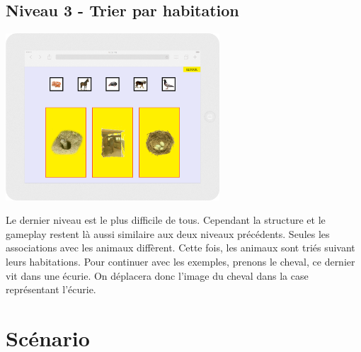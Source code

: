 \documentclass{article}
\begin{document}
\subsection{Niveau 3 - Trier par habitation}
\vspace{0.5cm}
\begin{center}
\includegraphics[width=0.6\textwidth]{page4}
\end{center}
\vspace{0.5cm}
\hspace*{0.6cm}Le dernier niveau est le plus difficile de tous. Cependant la structure et le gameplay restent l\`a aussi similaire aux deux niveaux pr\'ec\'edents. Seules les associations avec les animaux diff\`erent. Cette fois, les animaux sont tri\'es suivant leurs habitations. Pour continuer avec les exemples, prenons le cheval, ce dernier vit dans une \'ecurie. On d\'eplacera donc l'image du cheval dans la case repr\'esentant l'\'ecurie.
    
\section{Sc\'enario}
\end{document}
